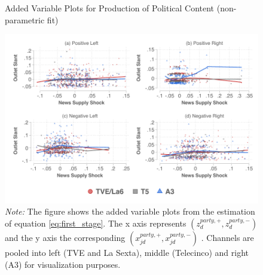 \documentclass[12pt]{article}
\begin{document}
		\begin{figure}[ht!]
		\centering
		\caption{Added Variable Plots for Production of Political Content (non-parametric fit)}
		\includegraphics[width=160mm]{figures/fwl_plots_lowess_v2}
		\caption*{\small \textit{Note:} The figure shows the added variable plots from the estimation of equation \ref{eq:first_stage}. The x axis represents $(z_d^{party,+},z_d^{party,-}) $ and the y axis the corresponding  $(x_{jd}^{party,+},x_{jd}^{party,-}) $   . Channels are pooled into left (TVE and La Sexta), middle (Telecinco) and right (A3) for visualization purposes.  }
		\label{fig:fwl_lowess}
	\end{figure}
	
\end{document}
